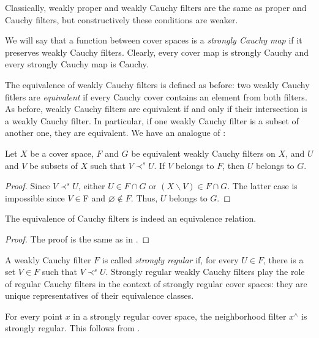 \documentclass[reqno]{amsart}
\theoremstyle{definition}
\theoremstyle{remark}
\numberwithin{figure}{section}
\newcommand{\rb}{\prec}
\begin{document}
\begin{remark}
Classically, weakly proper and weakly Cauchy filters are the same as proper and Cauchy filters, but constructively these conditions are weaker.
\end{remark}

We will say that a function between cover spaces is a \emph{strongly Cauchy map} if it preserves weakly Cauchy filters.
Clearly, every cover map is strongly Cauchy and every strongly Cauchy map is Cauchy.

The equivalence of weakly Cauchy filters is defined as before:
two weakly Cauchy fitlers are \emph{equivalent} if every Cauchy cover contains an element from both filters.
As before, weakly Cauchy filters are equivalent if and only if their intersection is a weakly Cauchy filter.
In particular, if one weakly Cauchy filter is a subset of another one, they are equivalent.
We have an analogue of :

\begin{lem}
Let $X$ be a cover space, $F$ and $G$ be equivalent weakly Cauchy filters on $X$, and $U$ and $V$ be subsets of $X$ such that $V \rb^s U$.
If $V$ belongs to $F$, then $U$ belongs to $G$.
\end{lem}
\begin{proof}
Since $V \rb^s U$, either $U \in F \cap G$ or $(X \backslash V) \in F \cap G$.
The latter case is impossible since $V \in $F and $\varnothing \notin F$.
Thus, $U$ belongs to $G$.
\end{proof}

\begin{prop}
The equivalence of Cauchy filters is indeed an equivalence relation.
\end{prop}
\begin{proof}
The proof is the same as in .
\end{proof}

A weakly Cauchy filter $F$ is called \emph{strongly regular} if, for every $U \in F$, there is a set $V \in F$ such that $V \rb^s U$.
Strongly regular weakly Cauchy filters play the role of regular Cauchy filters in the context of strongly regular cover spaces: they are unique representatives of their equivalence classes.

\begin{example}
For every point $x$ in a strongly regular cover space, the neighborhood filter $x^\wedge$ is strongly regular.
This follows from .
\end{example}
\end{document}
